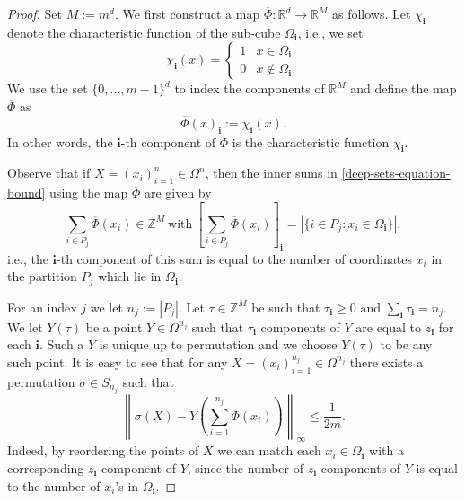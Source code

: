 \documentclass[twoside,11pt]{article}
\begin{document}
\begin{proof}
Set $M := m^d$. We first construct a map $\overline{\Phi}:\mathbb{R}^d\rightarrow \mathbb{R}^M$ as follows. Let $\chi_{\textbf{i}}$ denote the characteristic function of the sub-cube $\Omega_\textbf{i}$, i.e., we set
\begin{equation}
    \chi_{\textbf{i}}(x) = \begin{cases}
        1 & x\in \Omega_\textbf{i}\\
        0 & x\notin \Omega_\textbf{i}.
    \end{cases}
\end{equation}
We use the set $\{0,...,m-1\}^d$ to index the components of $\mathbb{R}^M$ and define the map $\overline{\Phi}$ as
\begin{equation}
    \overline{\Phi}(x)_{\textbf{i}} := \chi_{\textbf{i}}(x).
\end{equation}
In other words, the $\textbf{i}$-th component of $\overline{\Phi}$ is the characteristic function $\chi_\textbf{i}$. 

Observe that if $X = (x_i)_{i=1}^n\in \Omega^n$, then the inner sums in \eqref{deep-sets-equation-bound} using the map $\overline{\Phi}$ are given by
\begin{equation}
    \sum_{i\in P_j}\overline{\Phi}(x_i)\in \mathbb{Z}^{M}~\text{with}~\left[\sum_{i\in P_j} \overline{\Phi}(x_i)\right]_{\textbf{i}} = |\{i\in P_j:x_i\in \Omega_{\textbf{i}}\}|,
\end{equation}
i.e., the $\textbf{i}$-th component of this sum is equal to the number of coordinates $x_i$  in the partition $P_j$ which lie in $\Omega_\textbf{i}$. 

For an index $j$ we let $n_j := |P_j|$. Let $\tau\in \mathbb{Z}^M$ be such that $\tau_{\textbf{i}} \geq 0$ and $\sum_{\textbf{i}} \tau_\textbf{i} = n_j$. We let $Y(\tau)$ be a point $Y\in \Omega^{n_j}$ such that $\tau_\textbf{i}$ components of $Y$ are equal to $z_{\textbf{i}}$ for each $\textbf{i}$. Such a $Y$ is unique up to permutation and we choose $Y(\tau)$ to be any such point. It is easy to see that for any $X = (x_i)_{i=1}^{n_j}\in \Omega^{n_j}$ there exists a permutation $\sigma\in S_{n_j}$ such that
\begin{equation}\label{reordered-sigma-equation}
    \left\|\sigma(X) - Y\left(\sum_{i=1}^{n_j} \overline{\Phi}(x_i)\right)\right\|_{\infty} \leq \frac{1}{2m}.
\end{equation}
Indeed, by reordering the points of $X$ we can match each $x_i\in \Omega_\textbf{i}$ with a corresponding $z_\textbf{i}$ component of $Y$, since the number of $z_\textbf{i}$ components of $Y$ is equal to the number of $x_i$'s in $\Omega_\textbf{i}$.


\end{proof}
\end{document}
